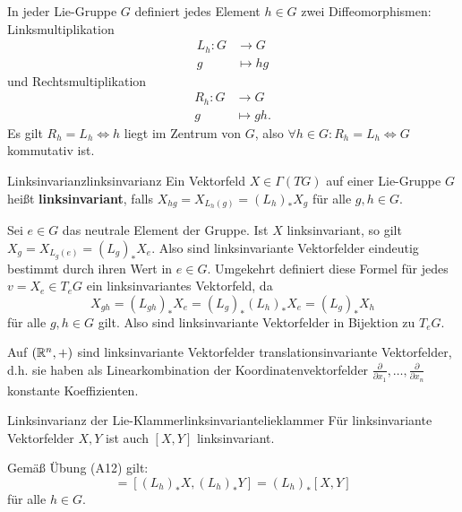 \begin{bemerkung}
In jeder Lie-Gruppe $G$ definiert jedes Element $h \in G$ zwei Diffeomorphismen:\\
Linksmultiplikation
\begin{align}
L_h: G &\to G \\
g &\mapsto hg
\end{align}
und Rechtsmultiplikation
\begin{align}
R_h: G &\to G\\
g &\mapsto gh.
\end{align}
Es gilt $R_h = L_h \iff h$ liegt im Zentrum von $G$, also $\forall h \in G: R_h = L_h \iff G$ kommutativ ist.
\end{bemerkung}
\begin{definition}{Linksinvarianz}{linksinvarianz}
Ein Vektorfeld $X \in \Gamma (TG)$ auf einer Lie-Gruppe $G$ heißt \textbf{linksinvariant}, falls $X_{hg} = X_{L_h(g)}=(L_h)_\ast X_g$ für alle $g,h \in G$.
\end{definition}
\begin{bemerkung}
Sei $e \in G$ das neutrale Element der Gruppe. Ist $X$ linksinvariant, so gilt $X_g = X_{L_g(e)} = (L_g)_\ast X_e$. Also sind linksinvariante Vektorfelder eindeutig bestimmt durch ihren Wert in $e \in G$. Umgekehrt definiert diese Formel für jedes $v = X_e \in T_eG$ ein linksinvariantes Vektorfeld, da 
\begin{equation}
X_{gh} = (L_{gh})_\ast X_e = (L_g)_\ast (L_h)_\ast X_e = (L_g)_\ast X_h
\end{equation}
für alle $g, h \in G$ gilt. Also sind linksinvariante Vektorfelder in Bijektion zu $T_eG$.
\end{bemerkung}
\begin{beispiel}
Auf $(\mathbb{R}^n, +)$ sind linksinvariante Vektorfelder translationsinvariante Vektorfelder, d.h. sie haben als Linearkombination der Koordinatenvektorfelder $\frac{\partial}{\partial x_1}, \dots, \frac{\partial}{\partial x_n}$ konstante Koeffizienten.
\end{beispiel}
\begin{lemma}{Linksinvarianz der Lie-Klammer}{linksinvariantelieklammer}
Für linksinvariante Vektorfelder $X,Y$ ist auch $[X, Y]$ linksinvariant.
\end{lemma}
\begin{beweis}
Gemäß Übung (A12) gilt: 
\begin{equation}
[X,Y] = [(L_h)_\ast X, (L_h)_\ast Y]= (L_h)_\ast [X,Y]
\end{equation}
für alle $h \in G$.
\end{beweis}
